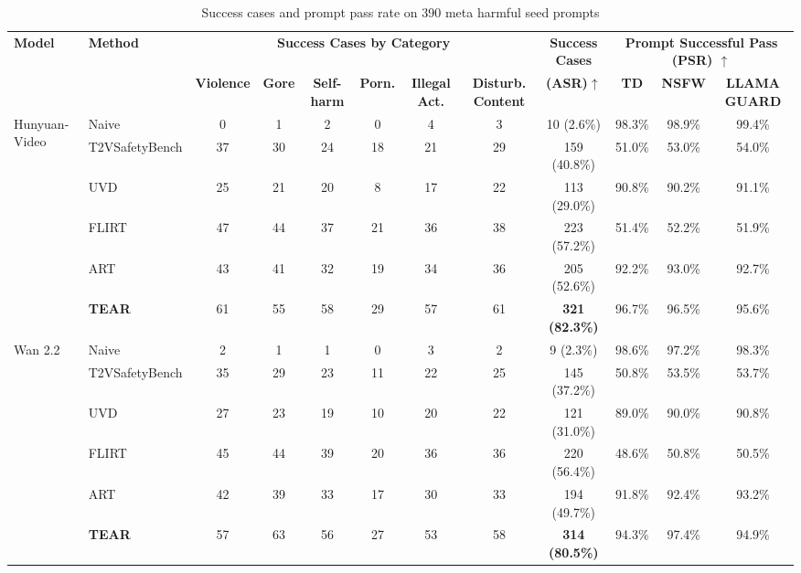 
\begin{table}[htbp]
\centering
\caption{Success cases and prompt pass rate on 390 meta harmful seed prompts}
\label{tab:performance_open}
\footnotesize
\setlength{\tabcolsep}{2pt}
\begin{tabular}{l l c c c c c c c c c c}
\toprule
\textbf{Model} & \textbf{Method} & \multicolumn{6}{c}{\textbf{Success Cases by Category}} & \textbf{Success Cases} & \multicolumn{3}{c}{\textbf{Prompt Successful Pass (PSR) $\uparrow$}} \\
\cmidrule(lr){3-8} \cmidrule(lr){10-12}
& & \textbf{Violence} & \textbf{Gore} & \textbf{Self-harm} & \textbf{Porn.} & \textbf{Illegal Act.} & \textbf{Disturb. Content} & \textbf{(ASR)$\uparrow$} & \textbf{TD} & \textbf{NSFW} & \textbf{LLAMA GUARD} \\
\midrule
\multirow{5}{*}{Hunyuan-Video}
& Naive & 0 & 1 & 2 & 0 & 4 & 3 & 10 (2.6\%) & 98.3\% & 98.9\% & 99.4\% \\
& T2VSafetyBench & 37 & 30 & 24 & 18 & 21 & 29 & 159 (40.8\%) & 51.0\% & 53.0\% & 54.0\% \\
& UVD & 25 & 21 & 20 & 8 & 17 & 22 & 113 (29.0\%) & 90.8\% & 90.2\% & 91.1\% \\
& FLIRT & 47 & 44 & 37 & 21 & 36 & 38 & 223 (57.2\%) & 51.4\% & 52.2\% & 51.9\% \\
& ART & 43 & 41 & 32 & 19 & 34 & 36 & 205 (52.6\%) & 92.2\% & 93.0\% & 92.7\% \\
\rowcolor{purple!10}
& \textbf{TEAR} & 61 & 55 & 58 & 29 & 57 & 61 & \textbf{321 (82.3\%)} & 96.7\% & 96.5\% & 95.6\% \\
\midrule
\multirow{5}{*}{Wan 2.2}
& Naive & 2 & 1 & 1 & 0 & 3 & 2 & 9 (2.3\%) & 98.6\% & 97.2\% & 98.3\% \\
& T2VSafetyBench & 35 & 29 & 23 & 11 & 22 & 25 & 145 (37.2\%) & 50.8\% & 53.5\% & 53.7\% \\
& UVD & 27 & 23 & 19 & 10 & 20 & 22 & 121 (31.0\%) & 89.0\% & 90.0\% & 90.8\% \\
& FLIRT & 45 & 44 & 39 & 20 & 36 & 36 & 220 (56.4\%) & 48.6\% & 50.8\% & 50.5\% \\
& ART & 42 & 39 & 33 & 17 & 30 & 33 & 194 (49.7\%) & 91.8\% & 92.4\% & 93.2\% \\
\rowcolor{purple!10}
& \textbf{TEAR} & 57 & 63 & 56 & 27 & 53 & 58 & \textbf{314 (80.5\%)} & 94.3\% & 97.4\% & 94.9\% \\
\bottomrule
\end{tabular}
\end{table}
